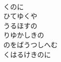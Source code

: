 \documentclass[10pt,b5j]{tarticle} %
\begin{document}
\begin{enumerate}
\begin{minipage}[c]{\blocksize}
        \vspace{\linespace}
        \item~\\
        くのに\\
        ひてゆくや\\
        うるほすの\\
        りゆかしきの\\
        のをばうつしへむ\\
        くはるけきのに
    
    \end{minipage}
\end{enumerate} %
\end{document}

